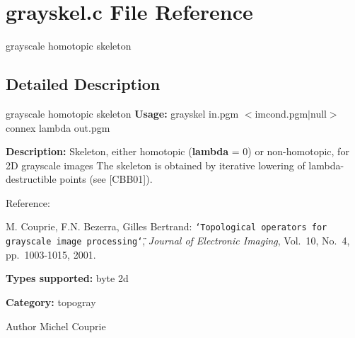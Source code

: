 \section{grayskel.c File Reference}
\label{grayskel_8c}


grayscale homotopic skeleton  




\subsection{Detailed Description}
grayscale homotopic skeleton {\bfseries Usage:} grayskel in.pgm $<$imcond.pgm$|$null$>$ connex lambda out.pgm

{\bfseries Description:} Skeleton, either homotopic ({\bfseries lambda} = 0) or non-\/homotopic, for 2D grayscale images The skeleton is obtained by iterative lowering of lambda-\/destructible points (see [CBB01]).

Reference:\par
 [CBB01] M. Couprie, F.N. Bezerra, Gilles Bertrand: {\tt \char`\"{}Topological operators for
grayscale image processing\char`\"{}}, {\itshape  Journal of Electronic Imaging\/}, Vol.~10, No.~4, pp.~1003-\/1015, 2001.

{\bfseries Types supported:} byte 2d

{\bfseries Category:} topogray

\begin{DoxyAuthor}{Author}
Michel Couprie 
\end{DoxyAuthor}
